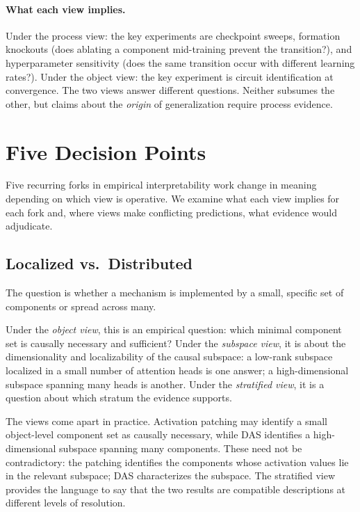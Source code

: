 \documentclass[11pt]{article}
\theoremstyle{remark}
\begin{document}
\paragraph{What each view implies.}
Under the process view: the key experiments are checkpoint sweeps,
formation knockouts (does ablating a component mid-training prevent the
transition?), and hyperparameter sensitivity (does the same transition
occur with different learning rates?).  Under the object view: the key
experiment is circuit identification at convergence.  The two views
answer different questions.  Neither subsumes the other, but claims about
the \emph{origin} of generalization require process evidence.

\section{Five Decision Points}\label{sec:decisions}

Five recurring forks in empirical interpretability work change in
meaning depending on which view is operative.  We examine what each
view implies for each fork and, where views make conflicting predictions,
what evidence would adjudicate.

\subsection{Localized vs.\ Distributed}

The question is whether a mechanism is implemented by a small, specific
set of components or spread across many.

Under the \emph{object view}, this is an empirical question: which
minimal component set is causally necessary and sufficient?  Under
the \emph{subspace view}, it is about the dimensionality and
localizability of the causal subspace: a low-rank subspace localized
in a small number of attention heads is one answer; a high-dimensional
subspace spanning many heads is another.  Under the \emph{stratified
view}, it is a question about which stratum the evidence supports.

The views come apart in practice.  Activation patching may identify a
small object-level component set as causally necessary, while DAS
identifies a high-dimensional subspace spanning many components.  These
need not be contradictory: the patching identifies the components whose
activation values lie in the relevant subspace; DAS characterizes the
subspace.  The stratified view provides the language to say that the
two results are compatible descriptions at different levels of
resolution.
\end{document}
